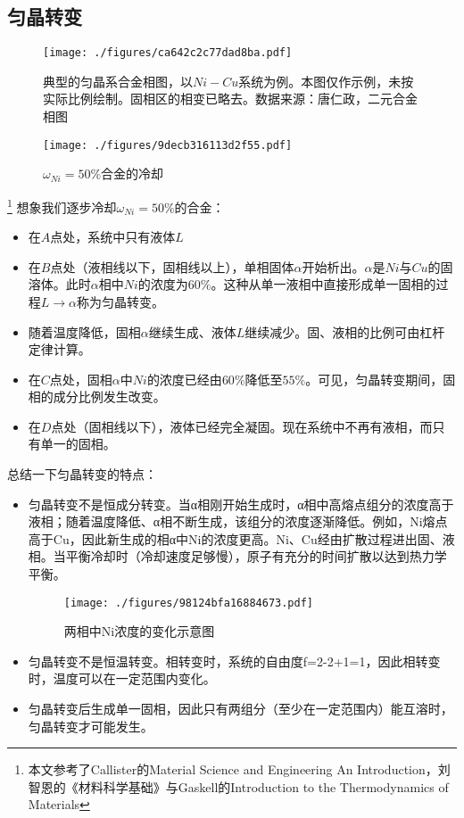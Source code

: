 

\subsection{匀晶转变}

\begin{figure}[ht]
\centering
\texttt{[image: ./figures/ca642c2c77dad8ba.pdf]}
\caption{典型的匀晶系合金相图，以$Ni-Cu$系统为例。本图仅作示例，未按实际比例绘制。固相区的相变已略去。数据来源：唐仁政，二元合金相图} \label{fig_ISOMOR_1}
\end{figure}

\begin{figure}[ht]
\centering
\texttt{[image: ./figures/9decb316113d2f55.pdf]}
\caption{$\omega_{Ni}=50\%$合金的冷却} \label{fig_ISOMOR_3}
\end{figure}

\footnote{本文参考了Callister的Material Science and Engineering An Introduction，刘智恩的《材料科学基础》与Gaskell的Introduction to the Thermodynamics of Materials}
想象我们逐步冷却$\omega_{Ni}=50\%$的合金：
\begin{itemize}
\item 在$A$点处，系统中只有液体$L$
\item 在$B$点处（液相线以下，固相线以上），单相固体$\alpha$开始析出。$\alpha$是$Ni$与$Cu$的固溶体。此时$\alpha$相中$Ni$的浓度为$60\%$。这种从单一液相中直接形成单一固相的过程$L\to\alpha$称为匀晶转变。
\item 随着温度降低，固相$\alpha$继续生成、液体$L$继续减少。固、液相的比例可由杠杆定律计算。%
\item 在$C$点处，固相$\alpha$中$Ni$的浓度已经由$60\%$降低至$55\%$。可见，匀晶转变期间，固相的成分比例发生改变。
\item 在$D$点处（固相线以下），液体已经完全凝固。现在系统中不再有液相，而只有单一的固相。

\end{itemize}

总结一下匀晶转变的特点：
\begin{itemize}
\item 匀晶转变不是恒成分转变。当α相刚开始生成时，α相中高熔点组分的浓度高于液相；随着温度降低、α相不断生成，该组分的浓度逐渐降低。例如，Ni熔点高于Cu，因此新生成的相α中Ni的浓度更高。Ni、Cu经由扩散过程进出固、液相。当平衡冷却时（冷却速度足够慢），原子有充分的时间扩散以达到热力学平衡。

\begin{figure}[ht]
\centering
\texttt{[image: ./figures/98124bfa16884673.pdf]}
\caption{两相中Ni浓度的变化示意图} \label{fig_ISOMOR_2}
\end{figure}

\item 匀晶转变不是恒温转变。相转变时，系统的自由度f=2-2+1=1，因此相转变时，温度可以在一定范围内变化。
\item 匀晶转变后生成单一固相，因此只有两组分（至少在一定范围内）能互溶时，匀晶转变才可能发生。
\end{itemize}

